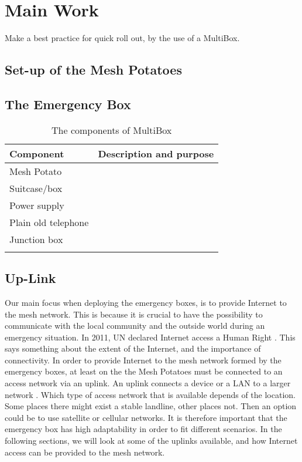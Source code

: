 \chapter{Main Work}
\label{chp:quickrollout} 

Make a best practice for quick roll out, by the use of a MultiBox. 

\section{Set-up of the Mesh Potatoes}

\section{The Emergency Box}

\begin{center}
\begin{table}[!ht]
\caption{\label{tab:components}The components of MultiBox}
    \begin{tabular}{ | l | p{9cm} |}
    \hline
    \textbf{Component} & \textbf{Description and purpose} \\ 
    \hline
    Mesh Potato &  \\ 
    \hline
    Suitcase/box &   \\ 
    \hline
    Power supply & \\
    \hline
    Plain old telephone & \\
	\hline
	Junction box & \\
	\hline
	 & \\
	\hline
    \end{tabular}
   \end{table}
\end{center}


\section{Up-Link}
Our main focus when deploying the emergency boxes, is to provide Internet to the mesh network. This is because it is crucial to have the possibility to communicate with the local community and the outside world during an emergency situation. In 2011, UN declared Internet access a Human Right \cite{HR}. This says something about the extent of the Internet, and the importance of connectivity. In order to provide Internet to the mesh network formed by the emergency boxes, at least on the the Mesh Potatoes must be connected to an access network via an uplink. An uplink connects a device or a LAN to a larger network \cite{uplink}. Which type of access network that is available depends of the location. Some places there might exist a stable landline, other places not. Then an option could be to use satellite or cellular networks. It is therefore important that the emergency box has high adaptability in order to fit different scenarios. In the following sections, we will look at some of the uplinks available, and how Internet access can be provided to the mesh network.  

